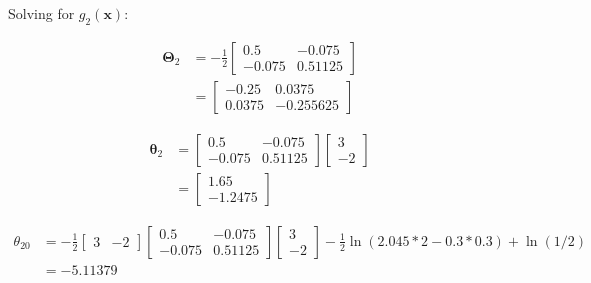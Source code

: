 \documentclass{homeworg}
\begin{document}
\newpage
Solving for $g_2(\bm{x})$:

\begin{equation}
    \begin{aligned}
        \bm{\Theta}_2 &= -\frac{1}{2}
        \begin{bmatrix}
            0.5 & -0.075 \\
            -0.075 & 0.51125
        \end{bmatrix}
        \\ &=
        \begin{bmatrix}
            -0.25 & 0.0375 \\
            0.0375 & -0.255625
        \end{bmatrix}
    \end{aligned}
\end{equation}

\begin{equation}
    \begin{aligned}
        \bm{\theta}_2 &=
        \begin{bmatrix}
            0.5 & -0.075 \\
            -0.075 & 0.51125
        \end{bmatrix}
        \begin{bmatrix}
            3 \\ -2
        \end{bmatrix}
        \\ &=
        \begin{bmatrix}
            1.65 \\
            -1.2475
        \end{bmatrix}
    \end{aligned}
\end{equation}

\begin{equation}
    \begin{aligned}
        {\theta}_{20} &=
        -\frac{1}{2}
        \begin{bmatrix}
            3 & -2
        \end{bmatrix}
        \begin{bmatrix}
            0.5 & -0.075 \\
            -0.075 & 0.51125
        \end{bmatrix}
        \begin{bmatrix}
            3 \\ -2
        \end{bmatrix}
        -\frac{1}{2}\ln(2.045*2-0.3*0.3)+\ln(1/2)
        \\ &= -5.11379
    \end{aligned}
\end{equation}
\end{document}
